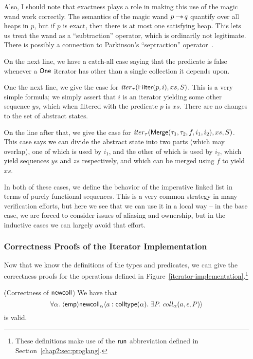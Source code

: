 Also, I should note that exactness plays a role in making this use of
the magic wand work correctly. The semantics of the magic wand $p
-\!\!*\, q$ quantify over all heaps in $p$, but if $p$ is exact, then
there is at most one satisfying heap. This lets us treat the wand as a
``subtraction'' operator, which is ordinarily not legitimate. There is
possibly a connection to Parkinson's ``septraction''
operator~\cite{parkinson-septraction}.

On the next line, we have a catch-all case saying that the predicate
is false whenever a $\mathsf{One}$ iterator has other than a single collection
it depends upon. 

One the next line, we give the case for $\mathit{iter}_\tau(\mathsf{Filter}(p, i),
xs, S)$.  This is a very simple formula; we simply assert that $i$ is
an iterator yielding some other sequence $ys$, which when filtered with
the predicate $p$ is $xs$. There are no changes to the set of abstract
states. 

On the line after that, we give the case for
$\mathit{iter}_\tau(\mathsf{Merge}(\tau_1, \tau_2, f, i_1, i_2), xs, S)$.  This
case says we can divide the abstract state into two parts (which may
overlap), one of which is used by $i_1$, and the other of which is
used by $i_2$, which yield sequences $ys$ and $zs$ respectively, and
which can be merged using $f$ to yield $xs$.

In both of these cases, we define the behavior of the imperative
linked list in terms of purely functional sequences. This is a very
common strategy in many verification efforts, but here we see that we
can use it in a local way -- in the base case, we are forced to
consider issues of aliasing and ownership, but in the inductive cases
we can largely avoid that effort.


\subsubsection{Correctness Proofs of the Iterator Implementation}

Now that we know the definitions of the types and predicates, we can
give the correctness proofs for the operations defined in
Figure~\ref{iterator-implementation}.\footnote{These definitions make
use of the $\mathsf{run}$ abbreviation defined in Section~\ref{chap2:sec:proglang}.}

\begin{lemma}{(Correctness of $\mathsf{newcoll}$)}
  We have that 
  \begin{displaymath}
    \forall \alpha.\; \langle{\mathsf{emp}}\rangle{\mathsf{newcoll}_\alpha}\langle{a:\mathsf{colltype}(\alpha)}.\;{\exists P.\; \mathit{coll}_\alpha(a, \epsilon,P)}\rangle
  \end{displaymath}
  is valid. 
\end{lemma}

